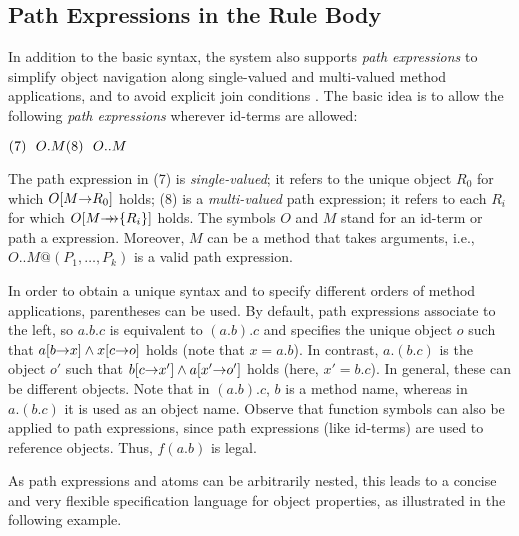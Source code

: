 \documentclass[11pt]{report}
\begin{document}
\subsection{Path Expressions in the Rule Body}

In addition to the basic \fl syntax, the \FLORA  system also supports
\emph{path expressions} to simplify object navigation along
single-valued and multi-valued method applications, and to avoid
explicit join conditions \cite{frohn-lausen-uphoff-VLDB-94}.  The
basic idea is to allow the following \emph{path expressions} wherever
id-terms are allowed:

  \medskip

\begin{math}
  \hfill (7)~~O.M \hfill (8)~~O..M \hfill
\end{math} \medskip

\noindent
The path expression in (7) is \emph{single-valued}; it refers to the unique
object $R_0$ for which $O[M{\rightarrow} R_0]$ holds; (8) is a \emph{multi-valued}
path expression; it refers to each $R_i$ for which $O[M{\rightarrow\!\!\!\!\rightarrow}\{R_i\}]$ holds.
The symbols $O$ and $M$ stand for an id-term or path a expression.
Moreover, $M$ can be a method that takes arguments, i.e.,
$O..M@(P_1,\dots,P_k)$ is a valid path expression.
  
In order to obtain a unique syntax and to specify different orders of
method applications, parentheses can be used. By default, path expressions
associate to the left, so $a.b.c$ is equivalent to $(a.b).c$ and specifies
the unique object $o$ such that $a[b{\rightarrow} x] \land x[c{\rightarrow} o]$ holds (note
that $x=a.b$). In contrast, $a.(b.c)$ is the object $o'$ such that $b[c{\rightarrow}
x'] \land a[x'{\rightarrow} o']$ holds (here, $x'=b.c$). In general, these can be
different objects. Note that in $(a.b).c$, $b$ is a method name, whereas in
$a.(b.c)$ it is used as an object name.  Observe that function symbols can
also be applied to path expressions, since path expressions (like id-terms)
are used to reference objects. Thus, $f(a.b)$ is legal.
  
As path expressions and \fl atoms can be arbitrarily nested, this leads
to a concise and very flexible specification language for object
properties, as illustrated in the following example.
\end{document}
